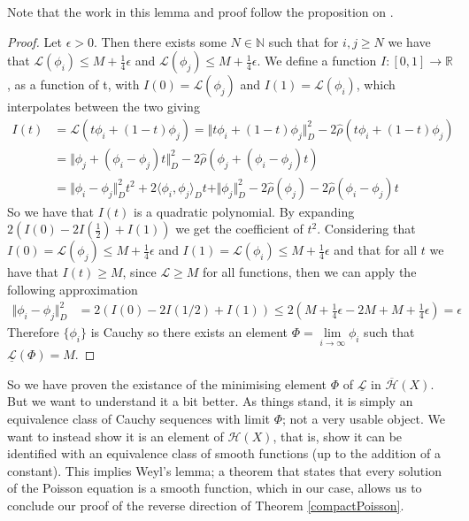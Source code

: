 \documentclass[11pt]{report}
\theoremstyle{definition}
\begin{document}
Note that the work in this lemma and proof follow the proposition on \cite[p.30]{notes}.
\begin{proof}
  Let $\epsilon > 0$. Then there exists some $N \in \mathbb{N}$ such that for $i,j \geq N$ we have that $\mathcal{L}(\phi_i) \leq M + \frac{1}{4}\epsilon$ and $\mathcal{L}(\phi_j) \leq M + \frac{1}{4}\epsilon$. We define a function $I:[0,1] \rightarrow \mathbb{R}$, as a function of t, with $I(0) = \mathcal{L}(\phi_j)$ and $I(1) = \mathcal{L}(\phi_i)$, which interpolates between the two giving
  \begin{align*}
    I(t) &= \mathcal{L}(t\phi_i + (1-t)\phi_j) = \Vert t\phi_i + (1-t)\phi_j \Vert^2_D - 2\hat{\rho}(t\phi_i + (1-t)\phi_j) \\
         &= \Vert \phi_j + (\phi_i - \phi_j)t \Vert^2_D - 2\hat{\rho}(\phi_j + (\phi_i - \phi_j)t) \\
         &= \Vert \phi_i - \phi_j \Vert^2_Dt^2 + 2\langle \phi_i, \phi_j\rangle_Dt + \Vert \phi_j \Vert^2_D - 2\hat{\rho}(\phi_j) - 2\hat{\rho}(\phi_i - \phi_j)t
  \end{align*}
  So we have that $I(t)$ is a quadratic polynomial. By expanding $2(I(0) - 2I(\frac{1}{2})+I(1))$ we get the coefficient of $t^2$. Considering that $I(0)= \mathcal{L}(\phi_j) \leq  M + \frac{1}{4}\epsilon$ and $I(1) = \mathcal{L}(\phi_i) \leq  M + \frac{1}{4}\epsilon$ and that for all $t$ we have that $I(t) \geq M$, since $\mathcal{L} \geq M$ for all functions, then we can apply the following approximation
  \begin{align*}
    \Vert \phi_i - \phi_j \Vert^2_D &= 2(I(0) - 2I(1/2)+I(1)) \leq 2(M + \frac{1}{4}\epsilon -2M + M + \frac{1}{4}\epsilon) = \epsilon
  \end{align*}
  Therefore $\{\phi_i\}$ is Cauchy so there exists an element $\Phi = \lim\limits_{i \rightarrow \infty}\phi_i$ such that $\underline{\mathcal{L}}(\Phi) = M$.
\end{proof}
So we have proven the existance of the minimising element $\Phi$ of $\underline{\mathcal{L}}$ in $\overline{\mathcal{H}}(X)$. But we want to understand it a bit better. As things stand, it is simply an equivalence class of Cauchy sequences with limit $\Phi$; not a very usable object. We want to instead show it is an element of $\mathcal{H}(X)$, that is, show it can be identified with an equivalence class of smooth functions (up to the addition of a constant). This implies Weyl's lemma; a theorem that states that every solution of the Poisson equation is a smooth function, which in our case, allows us to conclude our proof of the reverse direction of Theorem \ref{compactPoisson}.
\end{document}
